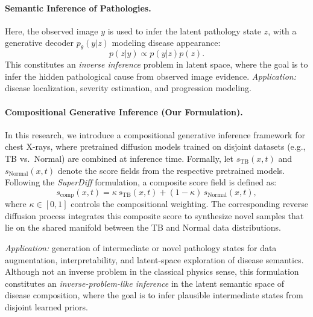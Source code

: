 \paragraph{Semantic Inference of Pathologies.}
Here, the observed image \( y \) is used to infer the latent pathology state \( z \), 
with a generative decoder \( p_\theta(y|z) \) modeling disease appearance:
\[
p(z|y) \propto p(y|z)p(z).
\]
This constitutes an \textit{inverse inference} problem in latent space, 
where the goal is to infer the hidden pathological cause from observed image evidence. 
\textit{Application:} disease localization, severity estimation, and progression modeling.

\paragraph{Compositional Generative Inference (Our Formulation).}
In this research, we introduce a compositional generative inference framework for chest X-rays, 
where pretrained diffusion models trained on disjoint datasets (e.g., TB vs.~Normal) are combined at inference time. 
Formally, let \( s_\text{TB}(x,t) \) and \( s_\text{Normal}(x,t) \) denote the score fields 
from the respective pretrained models. 
Following the \emph{SuperDiff} formulation, a composite score field is defined as:
\[
s_\text{comp}(x,t) = \kappa\, s_\text{TB}(x,t) + (1 - \kappa)\, s_\text{Normal}(x,t),
\]
where \( \kappa \in [0,1] \) controls the compositional weighting. 
The corresponding reverse diffusion process integrates this composite score to synthesize novel samples that 
lie on the shared manifold between the TB and Normal data distributions. 

\textit{Application:} 
generation of intermediate or novel pathology states for data augmentation, interpretability, and 
latent-space exploration of disease semantics. 
Although not an inverse problem in the classical physics sense, this formulation constitutes an 
\emph{inverse-problem-like inference} in the latent semantic space of disease composition, 
where the goal is to infer plausible intermediate states from disjoint learned priors.